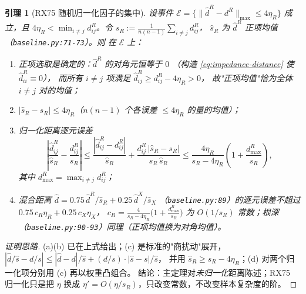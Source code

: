 \documentclass[UTF8,11pt]{ctexart}
\newtheorem{lemma}{引理}
\begin{document}
\begin{lemma}[RX75 随机归一化因子的集中]
\label{lem:normalize}
设事件 $\mathcal{E}=\{\|\hat d^R-d^R\|_{\max}\le 4\eta_R\}$ 成立，且
$4\eta_R<\min_{i\neq j}d^R_{ij}$。令 $s_R:=\frac{1}{n(n-1)}\sum_{i\neq j}d^R_{ij}$，
$\hat s_R$ 为 $\hat d^R$ 正项均值（\texttt{baseline.py:71-73}）。则
在 $\mathcal{E}$ 上：
\begin{enumerate}[label=\textup{(\alph*)},leftmargin=2.4em]
  \item 正项选取是\emph{确定}的：$\hat d^R$ 的对角元恒等于 $0$
        （构造 \eqref{eq:impedance-distance} 使 $\hat d^R_{ii}\equiv 0$），
        而所有 $i\neq j$ 项满足 $\hat d^R_{ij}\ge d^R_{ij}-4\eta_R>0$，
        故"正项均值"恰为全体 $i\neq j$ 对的均值；
  \item $|\hat s_R-s_R|\le 4\eta_R$（$n(n-1)$ 个各误差 $\le 4\eta_R$ 的量的均值）；
  \item 归一化距离逐元误差
        \begin{equation}
          \left|\frac{\hat d^R_{ij}}{\hat s_R}-\frac{d^R_{ij}}{s_R}\right|
          \le
          \frac{|\hat d^R_{ij}-d^R_{ij}|}{\hat s_R}
          +
          \frac{d^R_{ij}\,|\hat s_R-s_R|}{s_R\,\hat s_R}
          \le
          \frac{4\eta_R}{s_R-4\eta_R}
          \left(1+\frac{d^R_{\max}}{s_R}\right),
          \label{eq:normalize-chain}
        \end{equation}
        其中 $d^R_{\max}=\max_{i\neq j}d^R_{ij}$；
  \item 混合距离 $\hat d=0.75\,\hat d^R/\hat s_R+0.25\,\hat d^X/\hat s_X$
        （\texttt{baseline.py:89}）的逐元误差不超过
        $0.75\,c_R\eta_R+0.25\,c_X\eta_X$，
        $c_R=\frac{4}{s_R-4\eta_R}\bigl(1+\frac{d^R_{\max}}{s_R}\bigr)$ 为 $O(1/s_R)$
        常数；根深（\texttt{baseline.py:90-93}）同理（正项均值换为对角均值）。
\end{enumerate}
\end{lemma}

\begin{proof}[证明思路]
(a)(b) 已在上式给出；(c) 是标准的"商扰动"展开，
$|\hat d/\hat s-d/s|\le|\hat d-d|/\hat s+(d/s)\cdot|\hat s-s|/\hat s$，
并用 $\hat s_R\ge s_R-4\eta_R$；(d) 对两个归一化项分别用 (c) 再以权重凸组合。
结论：主定理对\emph{未归一化}距离陈述；RX75 归一化只是把 $\eta$ 换成
$\eta'=O(\eta/s_R)$，只改变常数，不改变样本复杂度的阶。
\end{proof}
\end{document}
